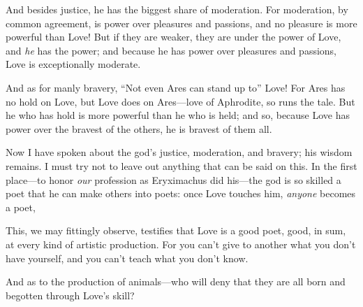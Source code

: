 And besides justice, he has the biggest share of
moderation. For
moderation, by common agreement, is power over pleasures and passions,
and no pleasure is more powerful than Love! But if they are weaker, they
are under the power of Love, and {\em he} has the power; and because he
has power over pleasures and passions, Love is exceptionally moderate.

And as for manly bravery, “Not even Ares can stand up to”
Love! For 
Ares has no hold on Love, but Love does on Ares---love of Aphrodite, so
runs the tale. But he
who has hold is more powerful than he who is held; and so, because Love
has power over the bravest of the others, he is bravest of them all.

Now I have spoken about the god’s justice, moderation, and bravery; his
wisdom remains. I
must try not to leave out anything that can be said on this. In the
first place---to honor {\em our} profession as Eryximachus  did
his---the god is so
skilled a poet that he can make others into poets: once Love touches
him, {\em anyone} becomes a poet,

\blank[line]
\blank[line]

This, we may fittingly observe, testifies that Love is a good poet,
good, in sum, at every kind of artistic production. For you can’t give
to another  what you don’t have yourself, and you can’t
teach what you don’t know.

And as to the production of animals---who will deny that they are all
born and begotten through Love’s skill?

